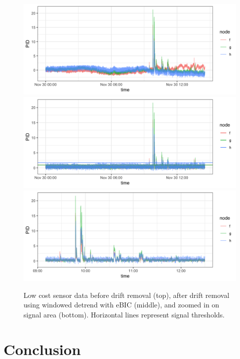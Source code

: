 \documentclass[12pt]{article}
\begin{document}
	\begin{figure}
		\caption{Low cost sensor data before drift removal (top), after drift removal using windowed detrend with eBIC (middle), 
			and zoomed in on signal area (bottom). Horizontal lines represent signal thresholds.}
		\includegraphics[width = \linewidth]{Figures/uncorrected_data.png}
		\includegraphics[width = \linewidth]{Figures/corrected_data.png}
		\includegraphics[width = \linewidth]{Figures/corrected_zoom_data.png}
	\end{figure}

		
	
	
	
	\section{Conclusion}
	\label{sec:conc}
	
\end{document}
